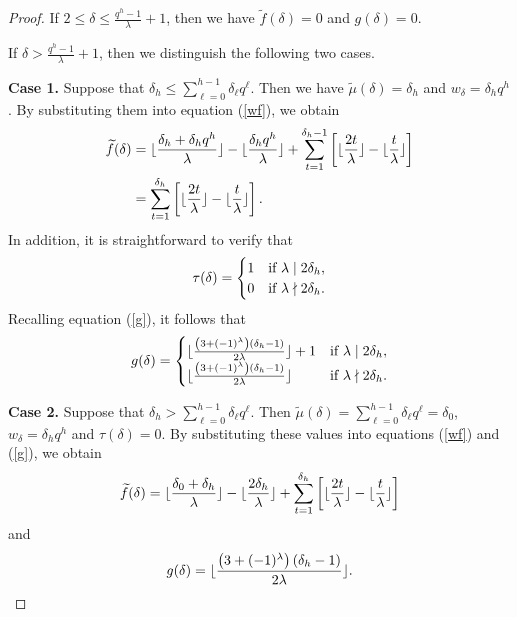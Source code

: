 \documentclass[journal,onecolumn]{IEEEtran}
\begin{document}
  \begin{proof}  
 If $2\leq \delta \leq \frac{q^h-1}{\lambda}+1$, then we have $\widetilde{f}(\delta)=0$ and $g(\delta)=0$. 
 
If  $\delta>\frac{q^h-1}{\lambda}+1  $, then  we distinguish the following two cases. 

\textbf{Case 1.} Suppose that  $\delta_h\leq \sum\limits_{\ell=0}^{h-1}\delta_{\ell}q^{\ell}$. Then we have  $\widetilde{\mu}(\delta)=\delta_h$ and $w_{\delta}=\delta_hq^h$. By substituting them  into equation (\ref{wf}),  we obtain  
\begin{equation}\notag
\begin{split}
\widetilde{f}(\delta)&=\lfloor \frac{\delta_h+\delta_{h}q^h}{\lambda}\rfloor-\lfloor \frac{\delta_{h}q^h}{\lambda}\rfloor + \sum\limits_{t=1}^{\delta_h-1}\left[ \lfloor \frac{2t}{\lambda} \rfloor -\lfloor \frac{t}{\lambda} \rfloor\right]   \\
&=\sum\limits_{t=1}^{\delta_h}\left[ \lfloor \frac{2t}{\lambda} \rfloor -\lfloor \frac{t}{\lambda} \rfloor\right].
\end{split}
\end{equation}
In addition,  it is straightforward to verify that  
\begin{equation}\notag
\tau(\delta)= 
\begin{cases}
  1 &\hbox{if }\lambda \mid 2\delta_h,\\
      0  & \hbox{if }\lambda \nmid 2\delta_h.
\end{cases}
\end{equation}
Recalling equation (\ref{g}), it follows that  
\begin{equation}\notag
    g(\delta)=\begin{cases}
\lfloor \frac{\left(3+(-1)^{\lambda}\right)(\delta_h-1)}{2\lambda}\rfloor+  1 &\hbox{if }\lambda \mid 2\delta_h,\\
     \lfloor \frac{\left(3+(-1)^{\lambda}\right)(\delta_h-1)}{2\lambda}\rfloor  &  \hbox{if }\lambda \nmid 2\delta_h.
\end{cases}
\end{equation}

\textbf{Case 2.}  Suppose that  $\delta_h>  \sum\limits_{\ell=0}^{h-1}\delta_{\ell}q^{\ell}$.  Then  $\widetilde{\mu}(\delta)=\sum\limits_{\ell=0}^{h-1}\delta_{\ell}q^{\ell}=\delta_0$,   $w_{\delta}=\delta_hq^h$ and $\tau(\delta)=0$. 
By substituting these values  into equations (\ref{wf}) and (\ref{g}),  we obtain  
\begin{equation}\notag
\widetilde{f}(\delta)=\lfloor \frac{\delta_0+\delta_h}{\lambda}\rfloor-\lfloor \frac{2\delta_h}{\lambda}\rfloor+\sum\limits_{t=1}^{\delta_h}\left[ \lfloor \frac{2t}{\lambda} \rfloor -\lfloor \frac{t}{\lambda} \rfloor\right] 
\end{equation}
and 
\begin{equation}\notag
   g(\delta)= \lfloor \frac{\left(3+(-1)^{\lambda}\right)(\delta_h-1)}{2\lambda}\rfloor.
\end{equation}


\end{proof}
\end{document}
